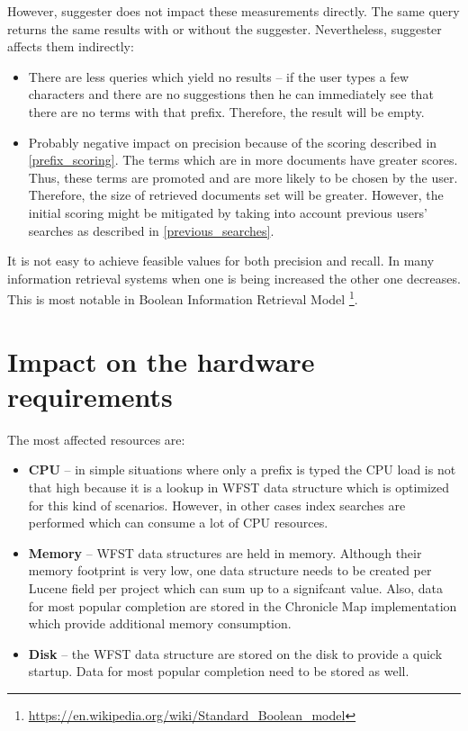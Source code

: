 However, suggester does not impact these measurements directly. The same query returns the same results with or without
the suggester. Nevertheless, suggester affects them indirectly:
\begin{itemize}
    \item There are less queries which yield no results – if the user types a few characters and there are no suggestions then he
    can immediately see that there are no terms with that prefix. Therefore, the result will be empty.
    \item Probably negative impact on precision because of the scoring described in \ref{prefix_scoring}. The terms which
    are in more documents have greater scores. Thus, these terms are promoted and are more likely to be chosen by the user.
    Therefore, the size of retrieved documents set will be greater. However, the initial scoring might be mitigated
    by taking into account previous users' searches as described in \ref{previous_searches}.
\end{itemize}

It is not easy to achieve feasible values for both precision and recall. In many information retrieval systems when one is
being increased the other one decreases. This is most notable in Boolean Information Retrieval Model
\footnote{\url{https://en.wikipedia.org/wiki/Standard\_Boolean\_model}}.

\section{Impact on the hardware requirements}
\label{hw_req_impact}
The most affected resources are:
\begin{itemize}
    \item \textbf{CPU} – in simple situations where only a prefix is typed the CPU load is not that high because it
    is a lookup in WFST data structure which is optimized for this kind of scenarios. However, in other cases
    index searches are performed which can consume a lot of CPU resources.
    \item \textbf{Memory} – WFST data structures are held in memory. Although their memory footprint is very low,
    one data structure needs to be created per Lucene field per project which can sum up to a signifcant value.
    Also, data for most popular completion are stored in the Chronicle Map implementation which provide additional
    memory consumption.
    \item \textbf{Disk} – the WFST data structure are stored on the disk to provide a quick startup.
    Data for most popular completion need to be stored as well.
\end{itemize}

